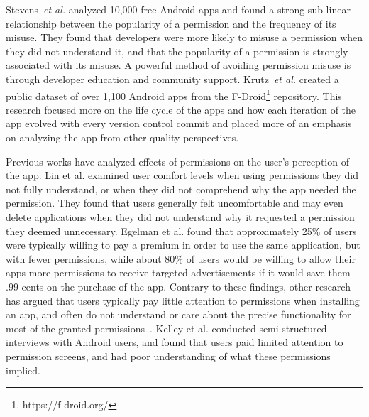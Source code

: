 \documentclass{sig-alternate-05-2015}
\newcommand{\dan}[1]{\textcolor{blue}{{\it [Dan says: #1]}}}
\begin{document}
Stevens~\emph{et al.}\cite{6624000} analyzed 10,000 free Android apps and found a strong sub-linear relationship between the popularity of a permission and the frequency of its misuse. They found that developers were more likely to misuse a permission when they did not understand it, and that the popularity of a permission is strongly associated with its misuse. A powerful method of avoiding permission misuse is through developer education and community support. Krutz~\emph{et al.}\cite{krutz2015FDroid} created a public dataset of over 1,100 Android apps from the F-Droid\footnote{https://f-droid.org/} repository. This research focused more on the life cycle of the apps and how each iteration of the app evolved with every version control commit and placed more of an emphasis on analyzing the app from other quality perspectives.





Previous works have analyzed effects of permissions on the user's perception of the app. Lin et al.\cite{Lin:2012:EPU:2370216.2370290} examined user comfort levels when using permissions they did not fully understand, or when they did not comprehend why the app needed the permission. They found that users generally felt uncomfortable and may even delete applications when they did not understand why it requested a permission they deemed unnecessary. Egelman et al.\cite{Egelman12choicearchitecture} found that approximately 25\% of users were typically willing to pay a premium in order to use the same application, but with fewer permissions, while about 80\% of users would be willing to allow their apps more permissions to receive targeted advertisements if it would save them .99 cents on the purchase of the app. Contrary to these findings, other research has argued that users typically pay little attention to permissions when installing an app, and often do not understand or care about the precise functionality for most of the granted permissions~\cite{Felt:2012:APU:2335356.2335360}. Kelley et al. \cite{Kelley:2012:CPI:2426020.2426027} conducted semi-structured interviews with Android users, and found that users paid limited attention to permission screens, and had poor understanding of what these permissions implied.%
\end{document}
